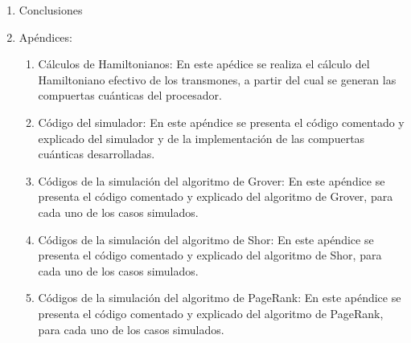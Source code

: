 \begin{enumerate}
    \item Conclusiones

    \item Apéndices:
        \begin{enumerate}

            \item Cálculos de Hamiltonianos: En este apédice se realiza el cálculo del Hamiltoniano efectivo de los transmones, a partir del cual se generan las compuertas cuánticas del procesador.

            \item Código del simulador: En este apéndice se presenta el código comentado y explicado del simulador y de la implementación de las compuertas cuánticas desarrolladas.

            \item Códigos de la simulación del algoritmo de Grover: En este apéndice se presenta el código comentado y explicado del algoritmo de Grover, para cada uno de los casos simulados.

            \item Códigos de la simulación del algoritmo de Shor: En este apéndice se presenta el código comentado y explicado del algoritmo de Shor, para cada uno de los casos simulados.

            \item Códigos de la simulación del algoritmo de PageRank: En este apéndice se presenta el código comentado y explicado del algoritmo de PageRank, para cada uno de los casos simulados.

        \end{enumerate}
\end{enumerate}
